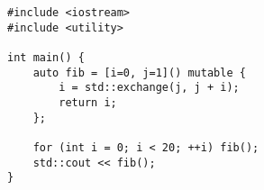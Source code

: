 \begin{lstlisting}[title=\href{https://godbolt.org/z/obozoK}{\texttt{godbolt.org/z/obozoK}}]
#include <iostream>
#include <utility>

int main() {
    auto fib = [i=0, j=1]() mutable {
        i = std::exchange(j, j + i);
        return i;
    };

    for (int i = 0; i < 20; ++i) fib();
    std::cout << fib();
}
\end{lstlisting}
